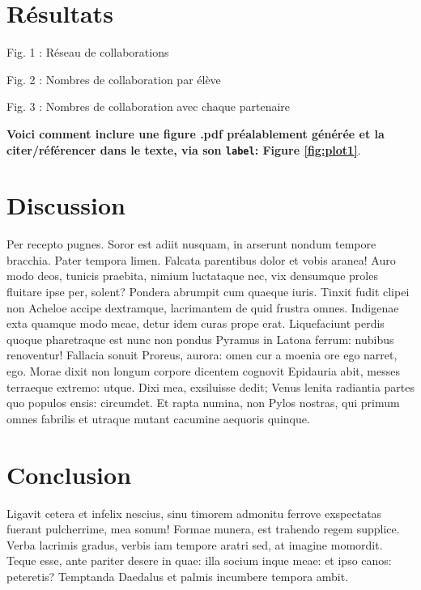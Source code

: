 \documentclass[9pt,twocolumn,twoside,]{pnas-new}
\begin{document}
\hypertarget{ruxe9sultats}{%
\section{Résultats}\label{ruxe9sultats}}

Fig. 1 : Réseau de collaborations

Fig. 2 : Nombres de collaboration par élève

Fig. 3 : Nombres de collaboration avec chaque partenaire

\textbf{Voici comment inclure une figure .pdf préalablement générée et
la citer/référencer dans le texte, via son \texttt{label}: Figure
\ref{fig:plot1}}.

\hypertarget{discussion}{%
\section{Discussion}\label{discussion}}

Per recepto pugnes. Soror est adiit nusquam, in arserunt nondum tempore
bracchia. Pater tempora limen. Falcata parentibus dolor et vobis aranea!
Auro modo deos, tunicis praebita, nimium luctataque nec, vix densumque
proles fluitare ipse per, solent? Pondera abrumpit cum quaeque iuris.
Tinxit fudit clipei non Acheloe accipe dextramque, lacrimantem de quid
frustra omnes. Indigenae exta quamque modo meae, detur idem curas prope
erat. Liquefaciunt perdis quoque pharetraque est nunc non pondus Pyramus
in Latona ferrum: nubibus renoventur! Fallacia sonuit Proreus, aurora:
omen cur a moenia ore ego narret, ego. Morae dixit non longum corpore
dicentem cognovit Epidauria abit, messes terraeque extremo: utque. Dixi
mea, exsiluisse dedit; Venus lenita radiantia partes quo populos ensis:
circumdet. Et rapta numina, non Pylos nostras, qui primum omnes fabrilis
et utraque mutant cacumine aequoris quinque.

\hypertarget{conclusion}{%
\section{Conclusion}\label{conclusion}}

Ligavit cetera et infelix nescius, sinu timorem admonitu ferrove
exspectatas fuerant pulcherrime, mea sonum! Formae munera, est trahendo
regem supplice. Verba lacrimis gradus, verbis iam tempore aratri sed, at
imagine momordit. Teque esse, ante pariter desere in quae: illa socium
inque meae: et ipso canos: peteretis? Temptanda Daedalus et palmis
incumbere tempora ambit.
\end{document}
